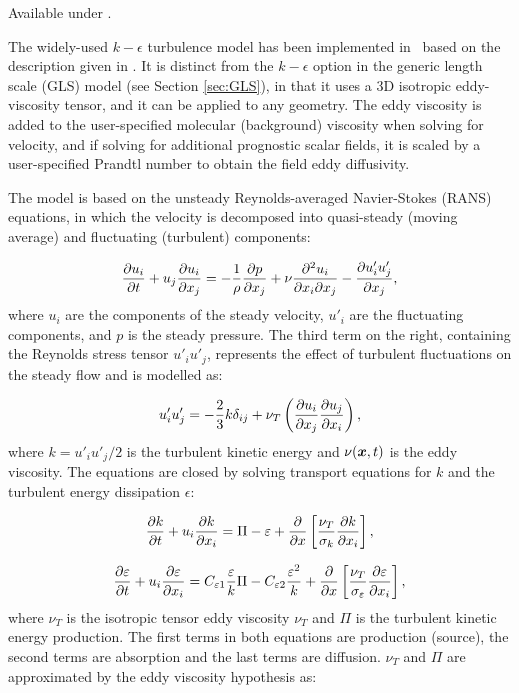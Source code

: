 Available under .

The widely-used $k-\epsilon$ turbulence model has been implemented in \fluidity\ based on the description given in
\citet{mathieu2000}. It is distinct from the $k-\epsilon$ option in the generic length scale (GLS) model (see
Section \ref{sec:GLS}), in that it uses a 3D isotropic eddy-viscosity tensor, and it can be applied to any geometry. The eddy viscosity is added to the user-specified molecular (background) viscosity when solving for velocity, and if solving for additional prognostic scalar fields, it is scaled by a user-specified Prandtl number to obtain the field eddy diffusivity.

The model is based on the unsteady Reynolds-averaged Navier-Stokes (RANS) equations, in which the velocity is decomposed into quasi-steady (moving average) and fluctuating (turbulent) components:

\begin{equation}\label{RANS}
\ppt[t]{u_i} + u_j \ppx[x_j]{u_i} = - \frac{1}{\rho } \ppx[x_j]{p} + \nu \frac{\partial^2 u_i}{\partial x_i \partial x_j} - \ppx[x_j]{u'_i u'_j},
\end{equation}
where $u_i$ are the components of the steady velocity, $u'_i$ are the fluctuating components, and $p$ is the steady pressure.
The third term on the right, containing the Reynolds stress tensor $u'_i u'_j$, represents the effect of turbulent fluctuations on the steady flow and is modelled as:

\begin{equation}\label{retens}
u'_i u'_j = - \frac 2 3 k \delta_{ij} + \nu_T \left (\ppx[x_j]{u_i} \ppx[x_i]{u_j} \right ),
\end{equation}
where $k=u'_i u'_j/2$ is the turbulent kinetic energy and $\nu(\bmx,t)$ is the eddy viscosity.
The equations are closed by solving transport equations for $k$ and the turbulent energy dissipation $\epsilon$:

\begin{equation}\label{k}
\ppt[t]{k} + u_i \ppx[x_i]{k} = \Pi - \epsilon + \ppx{} \left [ \frac{\nu_T}{\sigma_k} \ppx[x_i]{k} \right ],
\end{equation}

\begin{equation}\label{eps}
\ppt[t]{\epsilon} + u_i \ppx[x_i]{\epsilon} = C_{\epsilon1} \frac {\epsilon}{k} \Pi - C_{\epsilon2} \frac{\epsilon^2}{k} + \ppx{} \left [ \frac{\nu_T}{\sigma_\epsilon} \ppx[x_i]{\epsilon} \right ],
\end{equation}
where $\nu_T$ is the isotropic tensor eddy viscosity $\nu_T$ and $\Pi$ is the turbulent kinetic energy production. The first terms in both equations are production (source), the second terms are absorption and the last terms are diffusion. $\nu_T$ and $\Pi$ are approximated by the eddy viscosity hypothesis as:

